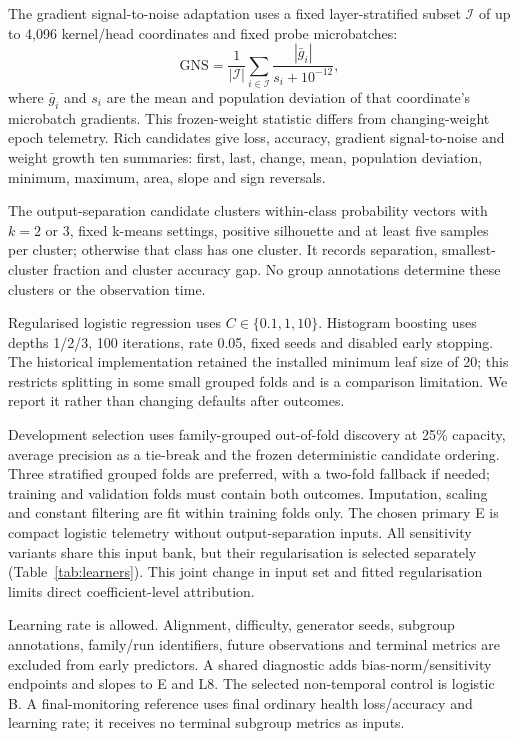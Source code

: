 \documentclass[nolineno]{ieeeaccess}
\begin{document}
The gradient signal-to-noise adaptation uses a fixed layer-stratified subset $\mathcal I$ of up to 4,096 kernel/head coordinates and fixed probe microbatches:
\begin{equation}
\mathrm{GNS}=\frac{1}{|\mathcal I|}\sum_{i\in\mathcal I}\frac{|\bar g_i|}{s_i+10^{-12}},
\label{eq:gns}
\end{equation}
where $\bar g_i$ and $s_i$ are the mean and population deviation of that coordinate's microbatch gradients. This frozen-weight statistic differs from changing-weight epoch telemetry. Rich candidates give loss, accuracy, gradient signal-to-noise and weight growth ten summaries: first, last, change, mean, population deviation, minimum, maximum, area, slope and sign reversals.

The output-separation candidate clusters within-class probability vectors with $k=2$ or $3$, fixed k-means settings, positive silhouette and at least five samples per cluster; otherwise that class has one cluster. It records separation, smallest-cluster fraction and cluster accuracy gap. No group annotations determine these clusters or the observation time.

Regularised logistic regression uses $C\in\{0.1,1,10\}$. Histogram boosting uses depths 1/2/3, 100 iterations, rate 0.05, fixed seeds and disabled early stopping. The historical implementation retained the installed minimum leaf size of 20; this restricts splitting in some small grouped folds and is a comparison limitation. We report it rather than changing defaults after outcomes.

Development selection uses family-grouped out-of-fold discovery at 25\% capacity, average precision as a tie-break and the frozen deterministic candidate ordering. Three stratified grouped folds are preferred, with a two-fold fallback if needed; training and validation folds must contain both outcomes. Imputation, scaling and constant filtering are fit within training folds only. The chosen primary E is compact logistic telemetry without output-separation inputs. All sensitivity variants share this input bank, but their regularisation is selected separately (Table~\ref{tab:learners}). This joint change in input set and fitted regularisation limits direct coefficient-level attribution.

Learning rate is allowed. Alignment, difficulty, generator seeds, subgroup annotations, family/run identifiers, future observations and terminal metrics are excluded from early predictors. A shared diagnostic adds bias-norm/sensitivity endpoints and slopes to E and L8. The selected non-temporal control is logistic B. A final-monitoring reference uses final ordinary health loss/accuracy and learning rate; it receives no terminal subgroup metrics as inputs.
\end{document}
